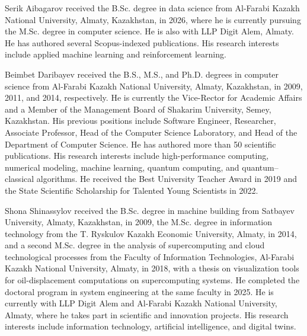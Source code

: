\documentclass{ieeeaccess}
\begin{document}
\begin{IEEEbiographynophoto}{Serik Aibagarov}
received the B.Sc. degree in data science from Al-Farabi Kazakh National
University, Almaty, Kazakhstan, in 2026, where he is currently pursuing the
M.Sc. degree in computer science. He is also with LLP Digit Alem, Almaty. He
has authored several Scopus-indexed publications. His research interests
include applied machine learning and reinforcement learning.
\end{IEEEbiographynophoto}

\begin{IEEEbiographynophoto}{Beimbet Daribayev}
received the B.S., M.S., and Ph.D. degrees in computer science from Al-Farabi
Kazakh National University, Almaty, Kazakhstan, in 2009, 2011, and 2014,
respectively. He is currently the Vice-Rector for Academic Affairs and a Member
of the Management Board of Shakarim University, Semey, Kazakhstan. His previous
positions include Software Engineer, Researcher, Associate Professor, Head of
the Computer Science Laboratory, and Head of the Department of Computer
Science. He has authored more than 50 scientific publications. His research
interests include high-performance computing, numerical modeling, machine
learning, quantum computing, and quantum--classical algorithms. He received the
Best University Teacher Award in 2019 and the State Scientific Scholarship for
Talented Young Scientists in 2022.
\end{IEEEbiographynophoto}

\begin{IEEEbiographynophoto}{Shona Shinassylov}
received the B.Sc. degree in machine building from Satbayev University, Almaty,
Kazakhstan, in 2009, the M.Sc. degree in information
technology from the T. Ryskulov Kazakh Economic University, Almaty, in 2014,
and a second M.Sc. degree in the analysis of supercomputing and cloud
technological processes from the Faculty of Information Technologies, Al-Farabi
Kazakh National University, Almaty, in 2018, with a thesis on visualization
tools for oil-displacement computations on supercomputing systems. He completed
the doctoral program in system engineering at the same faculty in 2025. He is
currently with LLP Digit Alem and Al-Farabi Kazakh National University, Almaty,
where he takes part in scientific and innovation projects. His research
interests include information technology, artificial intelligence, and digital
twins.
\end{IEEEbiographynophoto}
\end{document}

